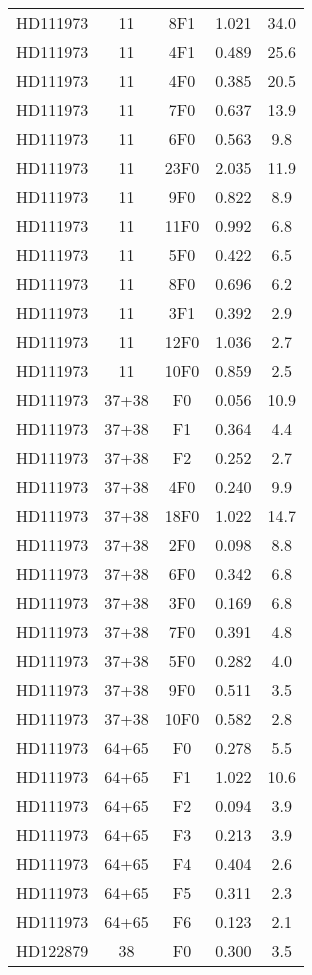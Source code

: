 \begin{table*}
\begin{tabular}{l c c c c}
HD111973 & 11 & 8F1 & 1.021 & 34.0\\ 
HD111973 & 11 & 4F1 & 0.489 & 25.6\\ 
HD111973 & 11 & 4F0 & 0.385 & 20.5\\ 
HD111973 & 11 & 7F0 & 0.637 & 13.9\\ 
HD111973 & 11 & 6F0 & 0.563 & 9.8\\ 
HD111973 & 11 & 23F0 & 2.035 & 11.9\\ 
HD111973 & 11 & 9F0 & 0.822 & 8.9\\ 
HD111973 & 11 & 11F0 & 0.992 & 6.8\\ 
HD111973 & 11 & 5F0 & 0.422 & 6.5\\ 
HD111973 & 11 & 8F0 & 0.696 & 6.2\\ 
HD111973 & 11 & 3F1 & 0.392 & 2.9\\ 
HD111973 & 11 & 12F0 & 1.036 & 2.7\\ 
HD111973 & 11 & 10F0 & 0.859 & 2.5\\ 
\hline
HD111973 & 37+38 & F0 & 0.056 & 10.9\\ 
HD111973 & 37+38 & F1 & 0.364 & 4.4\\ 
HD111973 & 37+38 & F2 & 0.252 & 2.7\\ 
HD111973 & 37+38 & 4F0 & 0.240 & 9.9\\ 
HD111973 & 37+38 & 18F0 & 1.022 & 14.7\\ 
HD111973 & 37+38 & 2F0 & 0.098 & 8.8\\ 
HD111973 & 37+38 & 6F0 & 0.342 & 6.8\\ 
HD111973 & 37+38 & 3F0 & 0.169 & 6.8\\ 
HD111973 & 37+38 & 7F0 & 0.391 & 4.8\\ 
HD111973 & 37+38 & 5F0 & 0.282 & 4.0\\ 
HD111973 & 37+38 & 9F0 & 0.511 & 3.5\\ 
HD111973 & 37+38 & 10F0 & 0.582 & 2.8\\ 
\hline
HD111973 & 64+65 & F0 & 0.278 & 5.5\\ 
HD111973 & 64+65 & F1 & 1.022 & 10.6\\ 
HD111973 & 64+65 & F2 & 0.094 & 3.9\\ 
HD111973 & 64+65 & F3 & 0.213 & 3.9\\ 
HD111973 & 64+65 & F4 & 0.404 & 2.6\\ 
HD111973 & 64+65 & F5 & 0.311 & 2.3\\ 
HD111973 & 64+65 & F6 & 0.123 & 2.1\\ 
\hline
HD122879 & 38 & F0 & 0.300 & 3.5\\ 

\end{tabular}
\end{table*}
